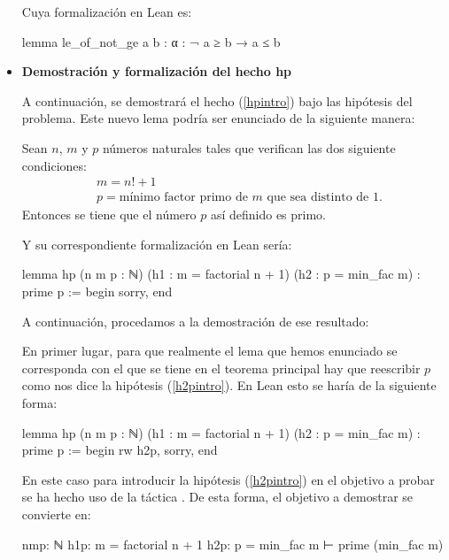 \begin{itemize}
  Cuya formalización en Lean es:
  \begin{leancode}
  lemma le_of_not_ge {a b : α} : ¬ a ≥ b → a ≤ b 
  \end{leancode}
  
\item \textbf{Demostración y formalización del hecho hp}

  A continuación, se demostrará el hecho (\ref{hpintro}) bajo las hipótesis
  del problema. Este nuevo lema podría ser enunciado de la siguiente manera:
  \begin{lema}
    Sean \(n\), \(m\) y \(p\) números naturales tales que verifican las dos
    siguiente condiciones:
    \begin{align}
      &m=n!+1\tag{h1p}\label{h1pintro}\\
      &p=\text{mínimo factor primo de }m\text{ que sea distinto de }1.\tag{h2p}
        \label{h2pintro} 
    \end{align}
    Entonces se tiene que el número \(p\) así definido es primo.
  \end{lema}

  Y su correspondiente formalización en Lean sería:
  \begin{leancode}
lemma hp
  (n m p : ℕ)
  (h1 : m = factorial n + 1)
  (h2 : p = min_fac m)
  : prime p :=
begin
  sorry,
end
  \end{leancode}

  A continuación, procedamos a la demostración de ese resultado:
  
  \begin{demostracion}
    
    En primer lugar, para que realmente el lema que hemos enunciado se
    corresponda con el que se tiene en el teorema principal hay que reescribir
    \(p\) como nos dice la hipótesis (\ref{h2pintro}). En Lean esto se haría
    de la siguiente forma:
    \begin{leancode}
lemma hp
  (n m p : ℕ)
  (h1 : m = factorial n + 1)
  (h2 : p = min_fac m)
  : prime p :=
begin
  rw h2p,
  sorry,
end
    \end{leancode}
    En este caso para introducir la hipótesis (\ref{h2pintro}) en el objetivo a
    probar se ha hecho uso de la táctica . De esta
    forma, el objetivo a demostrar se convierte en:
    \begin{leancode}
nmp: ℕ
h1p: m = factorial n + 1
h2p: p = min_fac m
⊢ prime (min_fac m)
    \end{leancode}


\end{demostracion}
\end{itemize}
